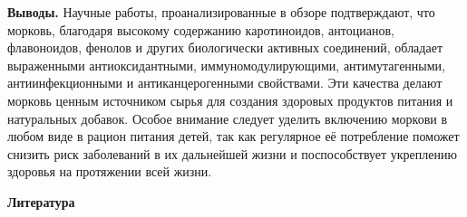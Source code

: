 \begin{multicols}{2}
{\bfseries Выводы.} Научные работы, проанализированные в обзоре
подтверждают, что морковь, благодаря высокому содержанию каротиноидов,
антоцианов, флавоноидов, фенолов и других биологически активных
соединений, обладает выраженными антиоксидантными, иммуномодулирующими,
антимутагенными, антиинфекционными и антиканцерогенными свойствами. Эти
качества делают морковь ценным источником сырья для создания здоровых
продуктов питания и натуральных добавок. Особое внимание следует уделить
включению моркови в любом виде в рацион питания детей, так как
регулярное её потребление поможет снизить риск заболеваний в их
дальнейшей жизни и поспособствует укреплению здоровья на протяжении всей
жизни.
\end{multicols}

\begin{center}
{\bfseries Литература}
\end{center}


